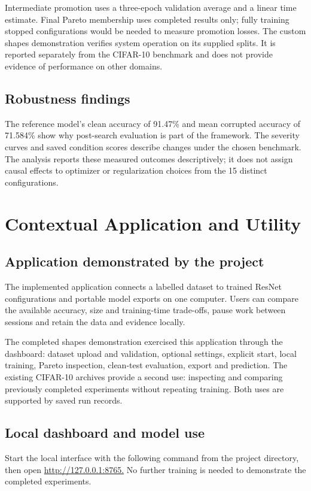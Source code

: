 \documentclass[11pt,a4paper,oneside]{report}
\begin{document}
Intermediate promotion uses a three-epoch validation average and a linear time estimate. Final Pareto membership uses completed results only; fully training stopped configurations would be needed to measure promotion losses. The custom shapes demonstration verifies system operation on its supplied splits. It is reported separately from the CIFAR-10 benchmark and does not provide evidence of performance on other domains.

\section{Robustness findings}
The reference model's clean accuracy of 91.47\% and mean corrupted accuracy of 71.584\% show why post-search evaluation is part of the framework. The severity curves and saved condition scores describe changes under the chosen benchmark. The analysis reports these measured outcomes descriptively; it does not assign causal effects to optimizer or regularization choices from the 15 distinct configurations.
\chapter{Contextual Application and Utility}
\section{Application demonstrated by the project}
The implemented application connects a labelled dataset to trained ResNet configurations and portable model exports on one computer. Users can compare the available accuracy, size and training-time trade-offs, pause work between sessions and retain the data and evidence locally.

The completed shapes demonstration exercised this application through the dashboard: dataset upload and validation, optional settings, explicit start, local training, Pareto inspection, clean-test evaluation, export and prediction. The existing CIFAR-10 archives provide a second use: inspecting and comparing previously completed experiments without repeating training. Both uses are supported by saved run records.

\section{Local dashboard and model use}

Start the local interface with the following command from the project directory, then open \url{http://127.0.0.1:8765.} No further training is needed to demonstrate the completed experiments.
\end{document}
